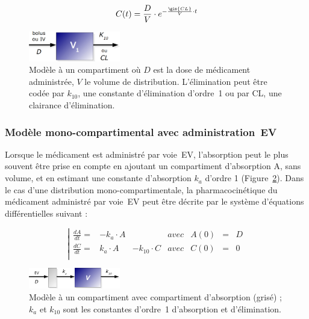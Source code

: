 \begin{equation}
C(t) = \frac{D}{V} \cdot e^{-\frac{\gls{CL}}{V}\cdot t}
\label{eq:18}
\end{equation}

\begin{figure}[htbp]
	\centering
		\includegraphics[width=4cm]{figures/raster/FIG_2}
	\caption[Modèle à un compartiment]{Modèle à un compartiment où $D$ est la dose de médicament administrée, $V$ le volume de distribution. L'élimination peut être codée par $k_{10}$, une constante d'élimination d'ordre~1 ou par \gls{CL}, une clairance d'élimination.}
	\label{fig:2}
\end{figure}

\subsubsection{Modèle mono-compartimental avec administration~\gls{EV}}
Lorsque le médicament est administré par voie~\gls{EV}, l'absorption peut le plus souvent être prise en compte en ajoutant un compartiment d'absorption A, sans volume, et en estimant une constante d'absorption $k_{a}$ d'ordre 1 (Figure~\ref{fig:3}). Dans le cas d'une distribution mono-compartimentale, la pharmacocinétique du médicament administré par voie~\gls{EV} peut être décrite par le système d'équations différentielles suivant :


\begin{equation}
\left| \begin{matrix}
\frac{dA}{dt} = & -k_{a}\cdot A &                & avec & A(0)&=&D\\ 
\frac{dC}{dt} = &  k_{a}\cdot A & -k_{10}\cdot C & avec & C(0)&=&0\\ 
\end{matrix}\right.
\label{eq:19}
\end{equation}

\begin{figure}[htbp]
	\centering
		\includegraphics[width=4cm]{figures/raster/FIG_3}
	\caption[Modèle à un compartiment avec compartiment d'absorption]{Modèle à un compartiment avec compartiment d'absorption (grisé) ; $k_{a}$ et $k_{10}$ sont les constantes d'ordre~1 d'absorption et d'élimination.}
	\label{fig:3}
\end{figure}

